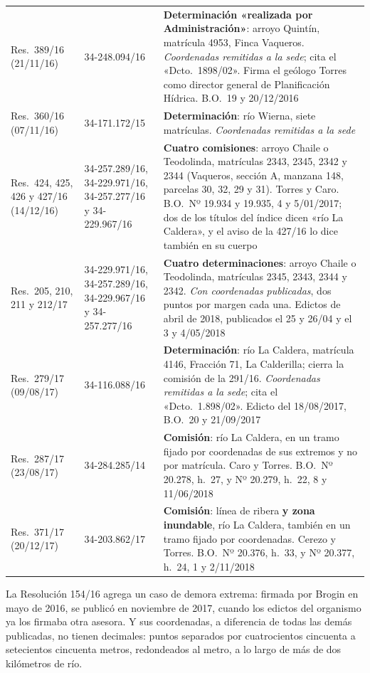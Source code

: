 {\begin{longtable}{@{}p{2.3cm}p{2.6cm}p{7cm}@{}}
Res.\ 389/16 (21/11/16) & 34-248.094/16 & \textbf{Determinación «realizada por Administración»}: arroyo Quintín, matrícula 4953, Finca Vaqueros. \textit{Coordenadas remitidas a la sede}; cita el «Dcto.\ 1898/02». Firma el geólogo Torres como director general de Planificación Hídrica. B.O.\ 19 y 20/12/2016 \\
Res.\ 360/16 (07/11/16) & 34-171.172/15 & \textbf{Determinación}: río Wierna, siete matrículas. \textit{Coordenadas remitidas a la sede} \\
Res.\ 424, 425, 426 y 427/16 (14/12/16) & 34-257.289/16, 34-229.971/16, 34-257.277/16 y 34-229.967/16 & \textbf{Cuatro comisiones}: arroyo Chaile o Teodolinda, matrículas 2343, 2345, 2342 y 2344 (Vaqueros, sección A, manzana 148, parcelas 30, 32, 29 y 31). Torres y Caro. B.O.\ Nº 19.934 y 19.935, 4 y 5/01/2017; dos de los títulos del índice dicen «río La Caldera», y el aviso de la 427/16 lo dice también en su cuerpo \\
Res.\ 205, 210, 211 y 212/17 & 34-229.971/16, 34-257.289/16, 34-229.967/16 y 34-257.277/16 & \textbf{Cuatro determinaciones}: arroyo Chaile o Teodolinda, matrículas 2345, 2343, 2344 y 2342. \textit{Con coordenadas publicadas}, dos puntos por margen cada una. Edictos de abril de 2018, publicados el 25 y 26/04 y el 3 y 4/05/2018 \\
Res.\ 279/17 (09/08/17) & 34-116.088/16 & \textbf{Determinación}: río La Caldera, matrícula 4146, Fracción 71, La Calderilla; cierra la comisión de la 291/16. \textit{Coordenadas remitidas a la sede}; cita el «Dcto.\ 1.898/02». Edicto del 18/08/2017, B.O.\ 20 y 21/09/2017 \\
Res.\ 287/17 (23/08/17) & 34-284.285/14 & \textbf{Comisión}: río La Caldera, en un tramo fijado por coordenadas de sus extremos y no por matrícula. Caro y Torres. B.O.\ Nº 20.278, h.\ 27, y Nº 20.279, h.\ 22, 8 y 11/06/2018 \\
Res.\ 371/17 (20/12/17) & 34-203.862/17 & \textbf{Comisión}: línea de ribera \textbf{y zona inundable}, río La Caldera, también en un tramo fijado por coordenadas. Cerezo y Torres. B.O.\ Nº 20.376, h.\ 33, y Nº 20.377, h.\ 24, 1 y 2/11/2018 \\
\bottomrule
\end{longtable}
}

La Resolución 154/16 agrega un caso de demora extrema: firmada por Brogin en mayo de 2016, se publicó en noviembre de 2017, cuando los edictos del organismo ya los firmaba otra asesora. Y sus coordenadas, a diferencia de todas las demás publicadas, no tienen decimales: puntos separados por cuatrocientos cincuenta a setecientos cincuenta metros, redondeados al metro, a lo largo de más de dos kilómetros de río.

